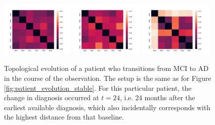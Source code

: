 \documentclass{article}
\begin{document}
\begin{figure}[htb]
  \centering \includegraphics[width=0.32\textwidth]{figures/temporal_evolution/ADNI029S0878_h_0.png}
  \hfill \includegraphics[width=0.32\textwidth]{figures/temporal_evolution/ADNI029S0878_h_1.png}
  \hfill \includegraphics[width=0.32\textwidth]{figures/temporal_evolution/ADNI029S0878_h_2.png}
    \caption{Topological evolution of a patient who transitions from MCI to AD in the course of the
observation. The setup is the same as for Figure \ref{fig:patient_evolution_stable}. For this
particular patient, the change in diagnosis occurred at $t=24$, i.e. 24 months after the earliest
available diagnosis, which also incidentally corresponds with the highest distance from that
baseline.}
    \label{fig:patient_evolution_mci_ad}
\end{figure}
\end{document}
